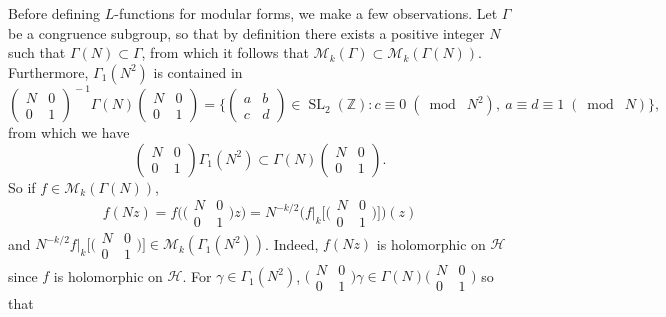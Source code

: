 \documentclass[10pt,leqno,twoside,b5paper]{article}
\theoremstyle{plain}
\theoremstyle{definition}
\numberwithin{equation}{section}
\numberwithin{lem}{section}
\DeclareMathOperator{\SL}{SL}
\newcommand{\smod}[1]{\;(\bmod\; #1)}
\newcommand{\abcd}{\begin{pmatrix}
    a & b \\ c & d
\end{pmatrix}}
\newcommand{\slz}{\SL_2(\mathbb{Z})}
\begin{document}
Before defining $L$-functions for modular forms, we make a few observations. Let $\varGamma$ be a congruence subgroup, so that by definition there exists a positive integer $N$ such that $\varGamma(N)\subset \varGamma$, from which it follows that $\mathcal M_k(\varGamma)\subset \mathcal M_k(\varGamma(N))$. Furthermore, $\varGamma_1(N^2)$ is contained in 
\[\begin{pmatrix}
    N & 0 \\ 0 & 1
\end{pmatrix}^{\!-1}\varGamma(N)\begin{pmatrix}
    N & 0 \\ 0 & 1
\end{pmatrix} = \Big\{\abcd\in \slz : c\equiv 0 \smod {N^2},~ a\equiv d\equiv 1\smod N\Big\},\] from which we have
\[\begin{pmatrix}
    N & 0 \\ 0 & 1
\end{pmatrix}\varGamma_1(N^2)\subset \varGamma(N)\begin{pmatrix}
    N & 0 \\ 0 & 1
\end{pmatrix}.\] So if $f\in \mathcal M_k(\varGamma(N))$,
\[f(Nz) = f\big(\big(\!\begin{smallmatrix}
    N & 0 \\ 0 & 1
\end{smallmatrix}\!\big)z\big) = N^{-k/2}\Big(f|_k\big[\big(\!\begin{smallmatrix}
    N & 0 \\ 0 & 1
\end{smallmatrix}\!\big)\big]\Big)(z)\] and $N^{-k/2}f|_k\big[\big(\!\begin{smallmatrix}
    N & 0 \\ 0 & 1
\end{smallmatrix}\!\big)\big]\in \mathcal M_k(\varGamma_1(N^2))$. Indeed, $f(Nz)$ is holomorphic on $\mathcal H$ since $f$ is holomorphic on $\mathcal H$. For $\gamma\in\varGamma_1(N^2)$, $\big(\!\begin{smallmatrix}
    N & 0 \\ 0 & 1
\end{smallmatrix}\!\big)\gamma\in \varGamma(N)\big(\!\begin{smallmatrix}
    N & 0 \\ 0 & 1
\end{smallmatrix}\!\big)$ so that
\end{document}

